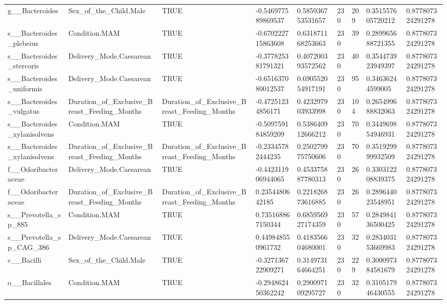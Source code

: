 \begin{longtable}{lllllllll}
g\_\_Bacteroides & Sex\_of\_the\_Child.Male & TRUE & -0.546977589869537 & 0.585936753531657 & 230 & 209 & 0.351557605720212 & 0.877807324291278 \\
s\_\_Bacteroides\_plebeius & Condition.MAM & TRUE & -0.670222715863608 & 0.631871168253663 & 230 & 39 & 0.289965688721355 & 0.877807324291278 \\
s\_\_Bacteroides\_stercoris & Delivery\_Mode.Caesarean & TRUE & -0.377825381791321 & 0.407200393572562 & 230 & 40 & 0.354473923949397 & 0.877807324291278 \\
s\_\_Bacteroides\_uniformis & Delivery\_Mode.Caesarean & TRUE & -0.651637080012537 & 0.690552054917191 & 230 & 95 & 0.34636244599005 & 0.877807324291278 \\
s\_\_Bacteroides\_vulgatus & Duration\_of\_Exclusive\_Breast\_Feeding\_Months & Duration\_of\_Exclusive\_Breast\_Feeding\_Months & -0.47251234856171 & 0.423297903933998 & 230 & 104 & 0.265499688832063 & 0.877807324291278 \\
s\_\_Bacteroides\_xylanisolvens & Condition.MAM & TRUE & -0.509759184859209 & 0.538640912666212 & 230 & 70 & 0.344969854946931 & 0.877807324291278 \\
s\_\_Bacteroides\_xylanisolvens & Duration\_of\_Exclusive\_Breast\_Feeding\_Months & Duration\_of\_Exclusive\_Breast\_Feeding\_Months & -0.23345782444235 & 0.250279975750606 & 230 & 70 & 0.351929999932509 & 0.877807324291278 \\
f\_\_Odoribacteraceae & Delivery\_Mode.Caesarean & TRUE & -0.442311906944065 & 0.453375887780313 & 230 & 26 & 0.330312208839375 & 0.877807324291278 \\
f\_\_Odoribacteraceae & Duration\_of\_Exclusive\_Breast\_Feeding\_Months & Duration\_of\_Exclusive\_Breast\_Feeding\_Months & 0.2354480642185 & 0.221826873616885 & 230 & 26 & 0.289644023548951 & 0.877807324291278 \\
s\_\_Prevotella\_sp\_885 & Condition.MAM & TRUE & 0.735168867150344 & 0.685956927174359 & 230 & 57 & 0.284984136500425 & 0.877807324291278 \\
s\_\_Prevotella\_sp\_CAG\_386 & Delivery\_Mode.Caesarean & TRUE & 0.449848550961732 & 0.418356604680001 & 230 & 32 & 0.283403153669983 & 0.877807324291278 \\
c\_\_Bacilli & Sex\_of\_the\_Child.Male & TRUE & -0.327136722909271 & 0.314973164664251 & 230 & 229 & 0.300097384581679 & 0.877807324291278 \\
o\_\_Bacillales & Condition.MAM & TRUE & -0.294862450362242 & 0.290097109295727 & 230 & 32 & 0.310517946430555 & 0.877807324291278 \\

\end{longtable}

